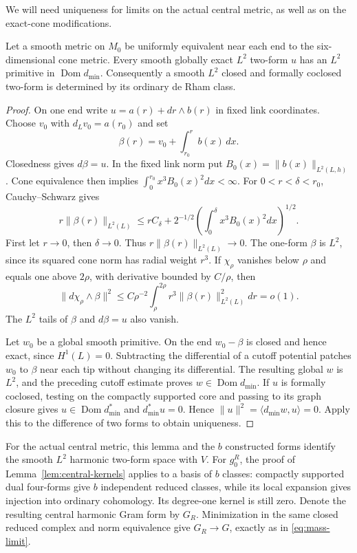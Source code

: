 We will need uniqueness for limits on the actual central metric, as
well as on the exact-cone modifications.

\begin{lemma}\label{lem:actual-harmonic-uniqueness}
Let a smooth metric on $M_0$ be uniformly equivalent near each end to
the six-dimensional cone metric. Every smooth globally exact $L^2$
two-form $u$ has an $L^2$ primitive in $\operatorname{Dom}d_{\min}$.
Consequently a smooth $L^2$ closed and formally coclosed two-form is
determined by its ordinary de Rham class.
\end{lemma}
\begin{proof}
On one end write $u=a(r)+dr\wedge b(r)$ in fixed link coordinates.
Choose $v_0$ with $d_Lv_0=a(r_0)$ and set
\[
 \beta(r)=v_0+\int_{r_0}^r b(x)\,dx.
\]
Closedness gives $d\beta=u$. In the fixed link norm put
$B_0(x)=\|b(x)\|_{L^2(L,h)}$. Cone equivalence then implies
$\int_0^{r_0}x^3B_0(x)^2dx<\infty$.
For $0<r<\delta<r_0$, Cauchy--Schwarz gives
\[
 r\|\beta(r)\|_{L^2(L)}
 \le rC_\delta+2^{-1/2}
       \left(\int_0^\delta x^3B_0(x)^2dx\right)^{1/2}.
\]
First let $r\to0$, then $\delta\to0$. Thus
$r\|\beta(r)\|_{L^2(L)}\to0$. The one-form $\beta$ is $L^2$,
since its squared cone norm has radial weight $r^3$. If $\chi_\rho$
vanishes below $\rho$ and equals one above $2\rho$, with derivative
bounded by $C/\rho$, then
\[
 \|d\chi_\rho\wedge\beta\|^2
 \le C\rho^{-2}\int_\rho^{2\rho}
        r^3\|\beta(r)\|_{L^2(L)}^2dr=o(1).
\]
The $L^2$ tails of $\beta$ and $d\beta=u$ also vanish.

Let $w_0$ be a global smooth primitive. On the end $w_0-\beta$ is
closed and hence exact, since $H^1(L)=0$. Subtracting the differential
of a cutoff potential patches $w_0$ to $\beta$ near each tip without
changing its differential. The resulting global $w$ is $L^2$, and the
preceding cutoff estimate proves $w\in\operatorname{Dom}d_{\min}$.
If $u$ is formally coclosed, testing on the compactly supported core
and passing to its graph closure gives
$u\in\operatorname{Dom}d_{\min}^*$ and $d_{\min}^*u=0$. Hence
$\|u\|^2=\langle d_{\min}w,u\rangle=0$.
Apply this to the difference of two forms to obtain uniqueness.
\end{proof}

For the actual central metric, this lemma and the $b$ constructed forms
identify the smooth $L^2$ harmonic two-form space with $V$.
For $g_0^R$, the proof of Lemma~\ref{lem:central-kernels} applies to
a basis of $b$ classes: compactly supported dual four-forms give $b$
independent reduced classes, while its local expansion gives injection
into ordinary cohomology. Its degree-one kernel is still zero.
Denote the resulting central harmonic Gram form by $G_R$.
Minimization in the same closed reduced complex and norm equivalence
give $G_R\to G$, exactly as in \eqref{eq:mass-limit}.

